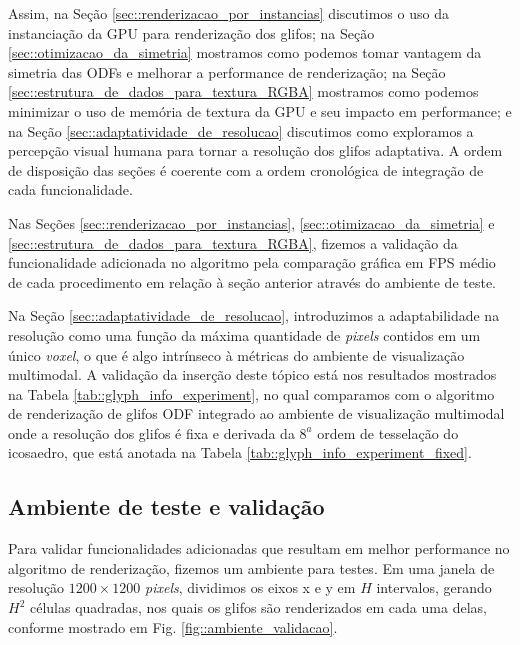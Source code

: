 \documentclass[
    12pt,                %
    oneside,            %
    a4paper,            %
    english,            %
    french,                %
    spanish,            %
    brazil                %
    ]{abntex2}
\begin{document}
Assim, na Seção \ref{sec::renderizacao_por_instancias} discutimos o uso da instanciação da GPU para renderização dos glifos; na Seção \ref{sec::otimizacao_da_simetria} mostramos como podemos tomar vantagem da simetria das ODFs e melhorar a performance de renderização; na Seção \ref{sec::estrutura_de_dados_para_textura_RGBA} mostramos como podemos minimizar o uso de memória de textura da GPU e seu impacto em performance; e na Seção \ref{sec::adaptatividade_de_resolucao} discutimos como exploramos a percepção visual humana para tornar a resolução dos glifos adaptativa. A ordem de disposição das seções é coerente com a ordem cronológica de integração de cada funcionalidade.

Nas Seções \ref{sec::renderizacao_por_instancias}, \ref{sec::otimizacao_da_simetria} e \ref{sec::estrutura_de_dados_para_textura_RGBA}, fizemos a validação da funcionalidade adicionada no algoritmo pela comparação gráfica em FPS médio de cada procedimento em relação à seção anterior através do ambiente de teste.%

Na Seção \ref{sec::adaptatividade_de_resolucao}, introduzimos a adaptabilidade na resolução como uma função da máxima quantidade de \textit{pixels} contidos em um único \textit{voxel}, o que é algo intrínseco à métricas do ambiente de visualização multimodal. A validação da inserção deste tópico está nos resultados mostrados na Tabela \ref{tab::glyph_info_experiment}, no qual comparamos com o algoritmo de renderização de glifos ODF integrado ao ambiente de visualização multimodal onde a resolução dos glifos é fixa e derivada da $8^a$ ordem de tesselação do icosaedro, que está anotada na Tabela \ref{tab::glyph_info_experiment_fixed}.




\subsection{Ambiente de teste e validação}
\label{sec::ambiente_teste}

Para validar funcionalidades adicionadas que resultam em melhor performance no algoritmo de renderização, fizemos um ambiente para testes. Em uma janela de resolução $1200 \times 1200$ \textit{pixels}, dividimos os eixos x e y em $H$ intervalos, gerando $H^2$ células quadradas, nos quais os glifos são renderizados em cada uma delas, conforme mostrado em Fig. \ref{fig::ambiente_validacao}.
\end{document}

